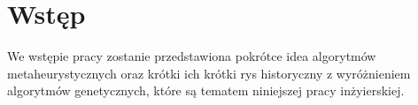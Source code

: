 \chapter{Wstęp}
\thispagestyle{chapterBeginStyle}

We wstępie pracy zostanie przedstawiona pokrótce idea algorytmów metaheurystycznych oraz krótki ich krótki rys historyczny z wyróżnieniem algorytmów genetycznych, które są tematem niniejszej pracy inżyierskiej. 

